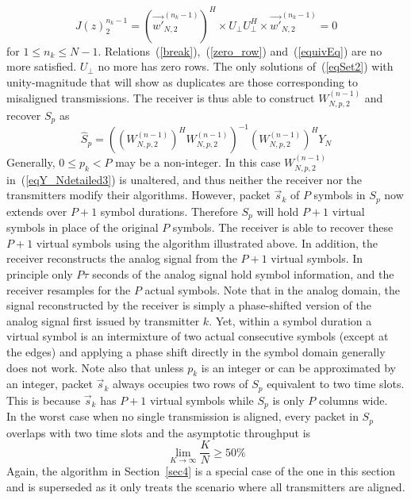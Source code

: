 \documentclass[10pt, a4paper, twocolumn]{IEEEtran}
\begin{document}
\begin{equation}
\label{eqSet2}
J(z)_2^{n_k-1} = (\overrightarrow{w'}_{N,2}^{(n_k-1)})^H\times U_{\bot} U_{\bot}^H\times \overrightarrow{w'}_{N,2}^{(n_k-1)} = 0
\end{equation} 
\noindent for $1\leq n_k\leq N-1$. Relations~(\ref{break}),~(\ref{zero_row}) and~(\ref{equivEq}) are no more satisfied. $U_{\bot}$ no more has zero rows. The only solutions of~(\ref{eqSet2}) with unity-magnitude that will show as duplicates are those corresponding to misaligned transmissions. The receiver is thus able to construct $W_{N,p,2}^{(n-1)}$ and recover $S_p$ as
\begin{equation}
\hat{S}_p = ((W_{N,p,2}^{(n-1)})^H W_{N,p,2}^{(n-1)})^{-1} (W_{N,p,2}^{(n-1)})^H Y_N
\end{equation}
\noindent Generally, $0\leq p_k < P$ may be a non-integer. In this case $W_{N,p,2}^{(n-1)}$ in~(\ref{eqY_Ndetailed3}) is unaltered, and thus neither the receiver nor the transmitters modify their algorithms. However, packet $\overrightarrow{s}_k$ of $P$ symbols in $S_p$ now extends over $P+1$ symbol durations. Therefore $S_p$ will hold $P+1$ virtual symbols in place of the original $P$ symbols. The receiver is able to recover these $P+1$ virtual symbols using the algorithm illustrated above. In addition, the receiver reconstructs the analog signal from the $P+1$ virtual symbols. In principle only $P\tau$ seconds of the analog signal hold symbol information, and the receiver resamples for the $P$ actual symbols. Note that in the analog domain, the signal reconstructed by the receiver is simply a phase-shifted version of the analog signal first issued by transmitter $k$. Yet, within a symbol duration a virtual symbol is an intermixture of two actual consecutive symbols (except at the edges) and applying a phase shift directly in the symbol domain generally does not work. Note also that unless $p_k$ is an integer or can be approximated by an integer, packet $\overrightarrow{s}_k$ always occupies two rows of $S_p$ equivalent to two time slots. This is because $\overrightarrow{s}_k$ has $P+1$ virtual symbols while $S_p$ is only $P$ columns wide.\\

\noindent In the worst case when no single transmission is aligned, every packet in $S_p$ overlaps with two time slots and the asymptotic throughput is
\begin{equation}
\lim_{K\rightarrow \infty}\frac{K}{N} \geq 50\%
\end{equation}
\noindent Again, the algorithm in Section~\ref{sec4} is a special case of the one in this section and is superseded as it only treats the scenario where all transmitters are aligned.
\end{document}
